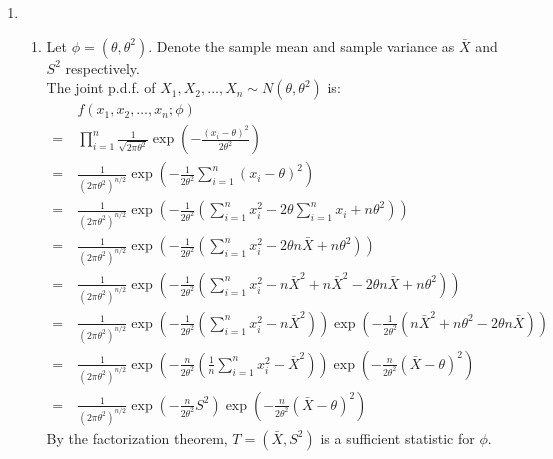\documentclass{article}
\begin{document}
\begin{enumerate}
\item
    \begin{enumerate}[label=(\roman*)]
    \item Let $\phi = (\theta, \theta^2)$. Denote the sample mean and sample variance as $\bar{X}$ and $S^2$ respectively. \\
    The joint p.d.f. of $X_1, X_2, \dots, X_n \sim N(\theta, \theta^2)$ is:
    \begin{align*}
    & f(x_1, x_2, \dots, x_n; \phi) \\
    =\ & \prod_{i=1}^n \frac{1}{\sqrt{2\pi\theta^2}} \exp\left( -\frac{(x_i - \theta)^2}{2\theta^2} \right) \\
    =\ & \frac{1}{(2\pi\theta^2)^{n/2}} \exp\left( -\frac{1}{2\theta^2} \sum_{i=1}^n (x_i - \theta)^2 \right) \\
    =\ & \frac{1}{(2\pi\theta^2)^{n/2}} \exp\left( -\frac{1}{2\theta^2} \left( \sum_{i=1}^n x_i^2 - 2\theta \sum_{i=1}^n x_i + n\theta^2 \right) \right) \\
    =\ & \frac{1}{(2\pi\theta^2)^{n/2}} \exp\left( -\frac{1}{2\theta^2} \left( \sum_{i=1}^n x_i^2 - 2\theta n\bar{X} + n\theta^2 \right) \right) \\
    =\ & \frac{1}{(2\pi\theta^2)^{n/2}} \exp\left( -\frac{1}{2\theta^2} (\sum_{i=1}^n x_i^2 - n\bar{X}^2 + n\bar{X}^2 - 2\theta n\bar{X} + n\theta^2) \right) \\
    =\ & \frac{1}{(2\pi\theta^2)^{n/2}} \exp\left( -\frac{1}{2\theta^2} (\sum_{i=1}^n x_i^2 - n\bar{X}^2) \right) \exp\left( -\frac{1}{2\theta^2} (n\bar{X}^2 + n\theta^2 - 2\theta n\bar{X}) \right) \\
    =\ & \frac{1}{(2\pi\theta^2)^{n/2}} \exp\left( -\frac{n}{2\theta^2} (\frac{1}{n} \sum_{i=1}^n x_i^2 - \bar{X}^2) \right) \exp\left( -\frac{n}{2\theta^2} (\bar{X} - \theta)^2 \right) \\
    =\ & \frac{1}{(2\pi\theta^2)^{n/2}} \exp\left( -\frac{n}{2\theta^2} S^2 \right) \exp\left( -\frac{n}{2\theta^2} (\bar{X} - \theta)^2 \right)
    \end{align*}
    By the factorization theorem, $T = (\bar{X}, S^2)$ is a sufficient statistic for $\phi$.


\end{enumerate}
\end{enumerate}
\end{document}
